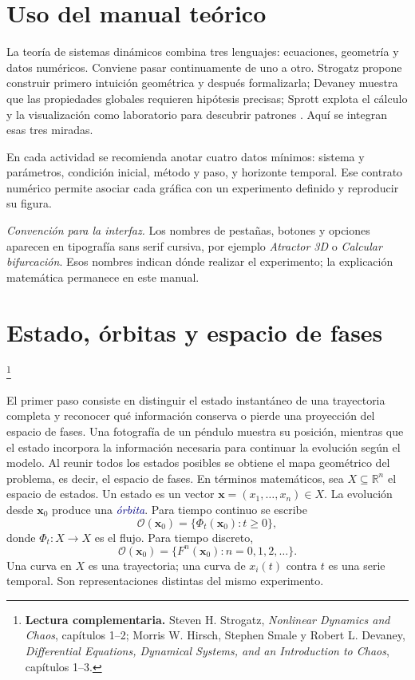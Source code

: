 \documentclass[11pt,a4paper]{article}
\newcommand{\R}{\mathbb{R}}
\newcommand{\gui}[1]{\textsf{\emph{#1}}}
\newcommand{\term}[1]{\textcolor{Navy}{\emph{#1}}}
\newcommand{\lecturaseccion}[1]{%
  \par\noindent{\sffamily\scriptsize\color{Teal}Lectura complementaria}\footnote{%
  \textbf{Lectura complementaria.} #1}\par}
\begin{document}
\section*{Uso del manual teórico}

La teoría de sistemas dinámicos combina tres lenguajes: ecuaciones, geometría y
datos numéricos. Conviene pasar continuamente de uno a otro. Strogatz propone
construir primero intuición geométrica y después formalizarla; Devaney muestra que
las propiedades globales requieren hipótesis precisas; Sprott explota el cálculo y la
visualización como laboratorio para descubrir patrones \cite{strogatz2024,devaney1989,sprott1993}.
Aquí se integran esas tres miradas.



En cada actividad se recomienda anotar cuatro datos mínimos: sistema y parámetros,
condición inicial, método y paso, y horizonte temporal. Ese contrato numérico permite
asociar cada gráfica con un experimento definido y reproducir su figura.

\noindent\emph{Convención para la interfaz.} Los nombres de pestañas, botones y
opciones aparecen en tipografía sans serif cursiva,
por ejemplo \gui{Atractor 3D} o \gui{Calcular bifurcación}. Esos nombres indican dónde
realizar el experimento; la explicación matemática permanece en este manual.

\section{Estado, órbitas y espacio de fases}
\lecturaseccion{Steven H. Strogatz, \emph{Nonlinear Dynamics and Chaos}, capítulos 1--2; Morris W. Hirsch, Stephen Smale y Robert L. Devaney, \emph{Differential Equations, Dynamical Systems, and an Introduction to Chaos}, capítulos 1--3.}

El primer paso consiste en distinguir el estado instantáneo de una trayectoria
completa y reconocer qué información conserva o pierde una proyección del espacio de
fases. Una fotografía de un péndulo muestra su posición, mientras que el estado
incorpora la información necesaria para continuar
la evolución según el modelo. Al reunir todos los estados posibles se obtiene el mapa
geométrico del problema, es decir, el espacio de fases. En términos matemáticos, sea
$X\subseteq\R^n$ el espacio de estados. Un estado es un vector
$\mathbf{x}=(x_1,\dots,x_n)\in X$. La evolución desde $\mathbf{x}_0$ produce una
\term{órbita}. Para tiempo continuo se escribe
\[
  \mathcal O(\mathbf{x}_0)=\{\Phi_t(\mathbf{x}_0):t\ge 0\},
\]
donde $\Phi_t:X\to X$ es el flujo. Para tiempo discreto,
\[
  \mathcal O(\mathbf{x}_0)=\{F^n(\mathbf{x}_0):n=0,1,2,\dots\}.
\]
Una curva en $X$ es una trayectoria; una curva de $x_i(t)$ contra $t$ es una
serie temporal. Son representaciones distintas del mismo experimento.
\end{document}
